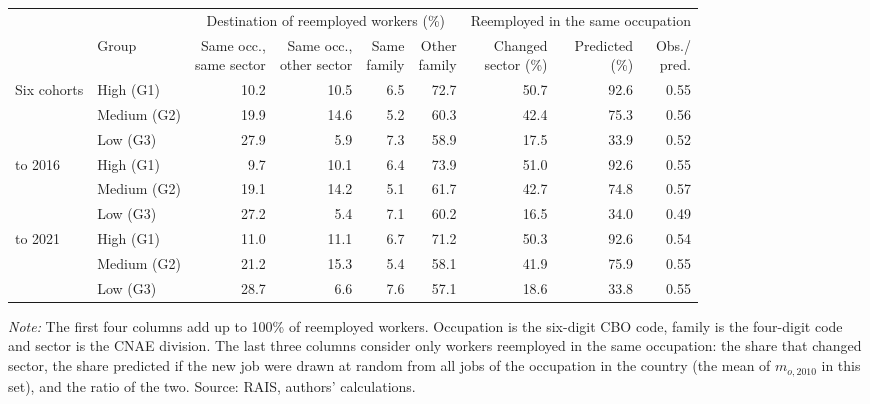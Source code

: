 {\footnotesize
\setlength{\tabcolsep}{3.6pt}
\begin{threeparttable}
\begin{tabular}{llrrrrrrr}
\toprule
 & & \multicolumn{4}{c}{Destination of reemployed workers (\%)} & \multicolumn{3}{c}{Reemployed in the same occupation} \\
\cmidrule(lr){3-6}\cmidrule(lr){7-9}
 & Group & \shortstack{Same occ.,\\same sector} & \shortstack{Same occ.,\\other sector} & \shortstack{Same\\family} & \shortstack{Other\\family} & \shortstack{Changed\\sector (\%)} & \shortstack{Predicted\\(\%)} & \shortstack{Obs./\\pred.} \\
\midrule
Six cohorts & High (G1) & 10.2 & 10.5 & 6.5 & 72.7 & 50.7 & 92.6 & 0.55 \\
 & Medium (G2) & 19.9 & 14.6 & 5.2 & 60.3 & 42.4 & 75.3 & 0.56 \\
 & Low (G3) & 27.9 & 5.9 & 7.3 & 58.9 & 17.5 & 33.9 & 0.52 \\
\addlinespace[3pt]
2014 to 2016 & High (G1) & 9.7 & 10.1 & 6.4 & 73.9 & 51.0 & 92.6 & 0.55 \\
 & Medium (G2) & 19.1 & 14.2 & 5.1 & 61.7 & 42.7 & 74.8 & 0.57 \\
 & Low (G3) & 27.2 & 5.4 & 7.1 & 60.2 & 16.5 & 34.0 & 0.49 \\
\addlinespace[3pt]
2019 to 2021 & High (G1) & 11.0 & 11.1 & 6.7 & 71.2 & 50.3 & 92.6 & 0.54 \\
 & Medium (G2) & 21.2 & 15.3 & 5.4 & 58.1 & 41.9 & 75.9 & 0.55 \\
 & Low (G3) & 28.7 & 6.6 & 7.6 & 57.1 & 18.6 & 33.8 & 0.55 \\
\bottomrule
\end{tabular}
\begin{tablenotes}[flushleft]\footnotesize
\item \textit{Note:} The first four columns add up to 100\% of reemployed workers. Occupation is the six-digit CBO code, family is the four-digit code and sector is the CNAE division. The last three columns consider only workers reemployed in the same occupation: the share that changed sector, the share predicted if the new job were drawn at random from all jobs of the occupation in the country (the mean of $m_{o,2010}$ in this set), and the ratio of the two. Source: RAIS, authors' calculations.
\end{tablenotes}
\end{threeparttable}
}
